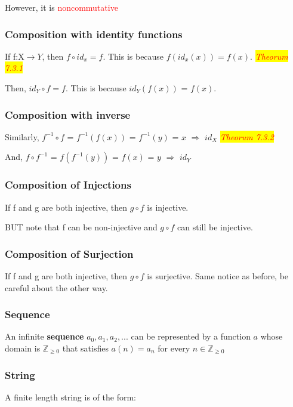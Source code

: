 \documentclass{article}
\newcommand{\theorum}[1]{\quad \quad \colorbox{yellow}{\textit{\textcolor{red}{Theorum #1}}}}
\newcommand{\sbreak}{\vspace{10pt}}
\begin{document}
However, it is \textcolor{red}{noncommutative}

\subsubsection{Composition with identity functions}
If f:X$\rightarrow Y$, then $f \circ id_x = f$. This is because $f(id_x(x)) = f(x)$. \theorum{7.3.1}

\sbreak

Then, $id_Y \circ f = f$. This is because $id_Y(f(x))$ = $f(x)$.

\subsubsection{Composition with inverse}
Similarly, $f^{-1}\circ f$ = $f^{-1}(f(x))$ = $f^{-1}(y)$ = $x$ $\Rightarrow$ $id_X$ \theorum{7.3.2}

\sbreak

And, $f\circ f^{-1}$ = $f(f^{-1}(y))$ = $f(x)$ = $y$ $\Rightarrow$ $id_Y$

\subsubsection{Composition of Injections}
If f and g are both injective, then $g \circ f$ is injective.

\sbreak

BUT note that f can be non-injective and $g\circ f$ can still be injective.

\subsubsection{Composition of Surjection}
If f and g are both injective, then $g \circ f$ is surjective. Same notice as before, be careful about the other way.

\subsubsection{Sequence}
An infinite \textbf{sequence} $a_0,a_1,a_2,...$ can be represented by a function $a$ whose domain is $\mathbb{Z}_{\geq 0}$ that satisfies $a(n)=a_n$ for every $n\in \mathbb{Z}_{\geq 0}$

\subsubsection{String}
A finite length string is of the form:
\end{document}
